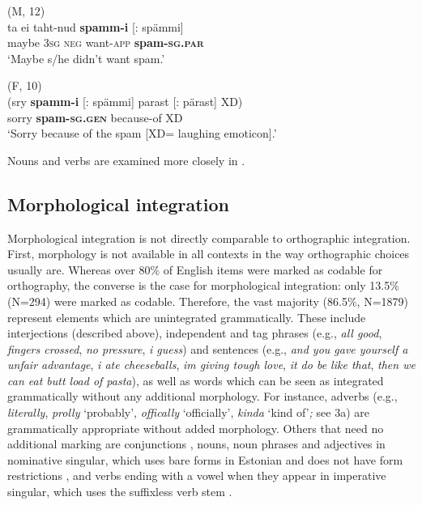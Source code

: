 \documentclass[output=paper]{langscibook}
\begin{document}
\ea%
    \label{ex:vihmanetal:2}
\ea   (M, 12)\\ \label{ex:vihmanetal:2a}
  ta   ei  taht-nud \textbf{{spamm-i} }{[: spämmi]}\\
maybe    \textsc{3sg}  \textsc{neg}  want-\textsc{app}  \textbf{spam-\textsc{sg.par}}\\
\glt  ‘Maybe s/he didn’t want spam.’

\ex(F, 10)\\ \label{ex:vihmanetal:2b}
\gll  (sry   {\textbf{spamm-i} [: spämmi]}  {parast [: pärast]}  XD)\\
sorry   \textbf{spam-\textsc{sg.gen}}    because-of    XD\\
\glt ‘Sorry because of the spam [XD= laughing emoticon].’
\z
\z




Nouns and verbs are examined more closely in .

\subsection{Morphological integration}\label{sec:vihmanetal:4.3}

Morphological integration is not directly comparable to orthographic integration. First, morphology is not available in all contexts in the way orthographic choices usually are. Whereas over 80\% of English items were marked as codable for orthography, the converse is the case for morphological integration: only 13.5\% (N=294) were marked as codable. Therefore, the vast majority (86.5\%, N=1879) represent elements which are unintegrated grammatically. These include interjections (described above), independent and tag phrases (e.g., \textit{all good}, \textit{fingers crossed}, \textit{no pressure}, \textit{i guess}) and sentences (e.g., \textit{and you gave yourself a unfair advantage}, \textit{i ate cheeseballs}, \textit{im giving tough love}, \textit{it do be like that}, \textit{then we can eat butt load of pasta}), as well as words which can be seen as integrated grammatically without any additional morphology. For instance, adverbs (e.g., \textit{literally}, \textit{prolly} ‘probably’, \textit{offically} ‘officially’, \textit{kinda} ‘kind of’\textit{;} see 3a) are grammatically appropriate without added morphology. Others that need no additional marking are conjunctions , nouns, noun phrases and adjectives in nominative singular, which uses bare forms in Estonian and does not have form restrictions , and verbs ending with a vowel when they appear in imperative singular, which uses the suffixless verb stem .
\end{document}
